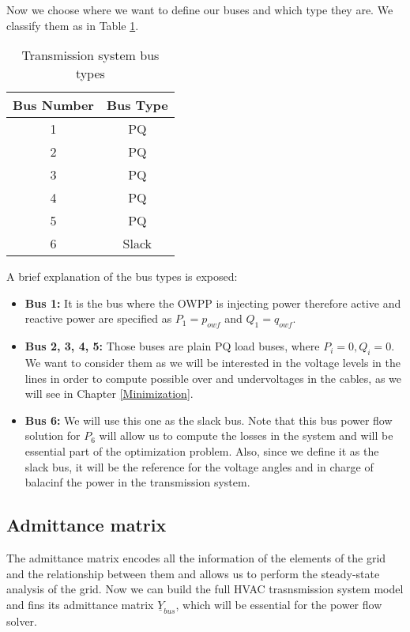 \documentclass[a4paper,11pt, titlepage, twoside]{article}
\begin{document}
Now we choose where we want to define our buses and which type they are. We classify them as in Table \ref{table:bus_types}.
\begin{table}[h]
\centering
\begin{tabular}{c|c}
\hline
\textbf{Bus Number} & \textbf{Bus Type} \\
\hline
1 & PQ \\
2 & PQ \\
3 & PQ \\
4 & PQ \\
5 & PQ \\
6 & Slack \\
\hline
\end{tabular}
\caption{ Transmission system bus types}
\label{table:bus_types}
\end{table}

A brief explanation of the bus types is exposed:
\begin{itemize}
    \item \textbf{Bus 1:} It is the bus where the OWPP is injecting power therefore active and reactive power are specified as $P_1=p_{owf}$ and $Q_1=q_{owf}$.
    \item \textbf{Bus 2, 3, 4, 5:} Those buses are plain  PQ load buses, where $P_i=0, Q_i=0$. We want to consider them as we will be interested in the voltage levels in the lines in order
    to compute possible over and undervoltages in the cables, as we will see in Chapter \ref{Minimization}.
    \item \textbf{Bus 6:} We will use this one as the slack bus. Note that this bus power flow solution for $P_6$ will allow us to compute the losses in the system
    and will be essential part of the optimization problem. Also, since we define it as the slack bus, it will be the reference for the voltage angles and in charge of balacinf the power in the transmission system. 
\end{itemize}
\subsection{Admittance matrix}

The admittance matrix encodes all the information of the elements of the grid and the relationship between them and allows us to perform the steady-state 
analysis of the grid.
Now we can build the full HVAC trasnsmission system model and fins its admittance matrix $\underline{Y}_{bus}$, which will be essential
for the power flow solver.
\end{document}
